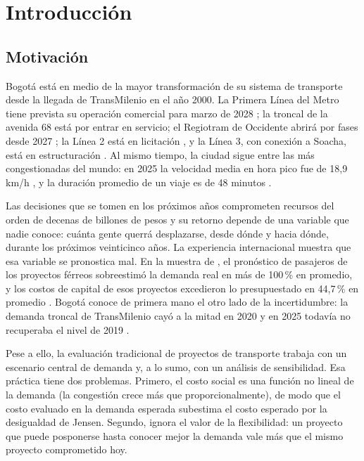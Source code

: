 \chapter{Introducción}\label{cap:introduccion}

\section{Motivación}

Bogotá está en medio de la mayor transformación de su sistema de transporte desde la llegada de
TransMilenio en el año 2000. La Primera Línea del Metro tiene prevista su operación comercial para
marzo de 2028 \citep{emb2026}; la troncal de la avenida 68 está por entrar en servicio; el Regiotram
de Occidente abrirá por fases desde 2027 \citep{regiotram2026}; la Línea 2 está en licitación
\citep{emb2026l2}, y la Línea 3, con conexión a Soacha, está en estructuración \citep{emb2026l3}. Al
mismo tiempo, la ciudad sigue entre las más congestionadas del mundo: en 2025 la velocidad media en
hora pico fue de 18,9 km/h \citep{tomtom2026}, y la duración promedio de un viaje es de 48 minutos
\citep{sdm2024}.

Las decisiones que se tomen en los próximos años comprometen recursos del orden de decenas de
billones de pesos y su retorno depende de una variable que nadie conoce: cuánta gente querrá
desplazarse, desde dónde y hacia dónde, durante los próximos veinticinco años. La experiencia
internacional muestra que esa variable se pronostica mal. En la muestra de \citet{flyvbjerg2005}, el
pronóstico de pasajeros de los proyectos férreos sobreestimó la demanda real en más de 100\,\% en
promedio, y los costos de capital de esos proyectos excedieron lo presupuestado en 44,7\,\% en
promedio \citep{flyvbjerg2005wb}. Bogotá conoce de primera mano el otro lado de la incertidumbre: la
demanda troncal de TransMilenio cayó a la mitad en 2020 y en 2025 todavía no recuperaba el nivel de
2019 \citep{silla2026}.

Pese a ello, la evaluación tradicional de proyectos de transporte trabaja con un escenario central de
demanda y, a lo sumo, con un análisis de sensibilidad. Esa práctica tiene dos problemas. Primero, el
costo social es una función no lineal de la demanda (la congestión crece más que
proporcionalmente), de modo que el costo evaluado en la demanda esperada subestima el costo esperado
por la desigualdad de Jensen. Segundo, ignora el valor de la flexibilidad: un proyecto que puede
posponerse hasta conocer mejor la demanda vale más que el mismo proyecto comprometido hoy.

